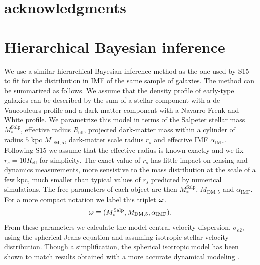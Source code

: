 \documentclass[usenatbib]{mnras}
\newcommand{\boldsymbol}[1]{\mbox{\boldmath{${#1}$}}}
\def\mdm{M_{\mathrm{DM}}}
\def\reff{R_{\mathrm{eff}}}
\def\msalp{M_*^{\mathrm{Salp}}}
\def\aimf{\alpha_{\mathrm{IMF}}}
\def\mdm{M_{\mathrm{DM},5}}
\def\sigmaee{\sigma_{e2}}
\def\indpar{\boldsymbol{\omega}}
\begin{document}
\section*{acknowledgments}


%





\appendix
\onecolumn
\section{Hierarchical Bayesian inference}\label{sect:appendix}
We use a similar hierarchical Bayesian inference method as the one
used by S15 to fit for the distribution in IMF of the same sample of
galaxies. The method can be summarized as follows.  We assume that the
density profile of early-type galaxies can be described by the sum of
a stellar component with a de Vaucouleurs profile and a dark-matter
component with a Navarro Frenk and White \citep{NFW97} profile.  We
parametrize this model in terms of the Salpeter stellar mass $\msalp$,
effective radius $\reff$, projected dark-matter mass within a cylinder
of radius $5$ kpc $\mdm$, dark-matter scale radius $r_s$ and effective
IMF $\aimf$.  Following S15 we assume that the effective radius is
known exactly and we fix $r_s = 10\reff$ for simplicity. The exact
value of $r_s$ has little impact on lensing and dynamics measurements,
more sensistive to the mass distribution at the scale of a few kpc,
much smaller than typical values of $r_s$ predicted by numerical
simulations.  The free parameters of each object are then $\msalp$,
$\mdm$ and $\aimf$. For a more compact notation we label this triplet $\indpar$.
\begin{equation}
\indpar \equiv(\msalp, \mdm, \aimf).
\end{equation}
From these parameters we calculate the model
central velocity dispersion, $\sigmaee$, using the spherical Jeans
equation and assuming isotropic stellar velocity distribution.
Though a simplification, the spherical isotropic model has been shown
to match results obtained with a more accurate dynamical modeling
\citep{Bar++11}.
\end{document}
